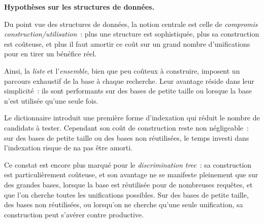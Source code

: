 \documentclass[11pt]{article}
\newenvironment{paraph}[1]{%
  \medskip
  \noindent\textbf{#1.}\quad

  \vspace{0.2cm}
}{%
  \medskip
}
\begin{document}
\begin{paraph}{Hypothèses sur les structures de données}
    Du point vue des structures de données, la notion centrale est celle de \textit{compromis construction/utilisation}~:
    plus une structure est sophistiquée, plus sa construction est coûteuse, et plus il faut
    amortir ce coût sur un grand nombre d'unifications pour en tirer un bénéfice réel.

    \vspace{0.2cm}
    Ainsi, la \textit{liste} et l'\textit{ensemble}, bien que peu coûteux à construire, imposent un parcours
    exhaustif de la base à chaque recherche. Leur avantage réside dans leur simplicité~: ils sont performants
    sur des bases de petite taille ou lorsque la base n'est utilisée qu'une seule fois.

    \vspace{0.2cm}
    Le dictionnaire introduit une première forme d'indexation qui réduit le nombre de candidats
    à tester. Cependant son coût de construction reste non négligeable~: sur des bases de petite taille ou des bases non réutilisées, 
    le temps investi dans l'indexation risque de na pas être amorti.

    \vspace{0.2cm}
    Ce constat est encore plus marqué pour le \textit{discrimination tree}~: sa construction est
    particulièrement coûteuse, et son avantage ne se manifeste pleinement que sur des grandes bases,
    lorsque la base est réutilisée pour de nombreuses requêtes, et que l'on cherche toutes les unifications possibles.
    Sur des bases de petite taille, des bases non réutilisées, ou lorsqu'on ne cherche qu'une seule unification, sa 
    construction peut s'avérer contre productive.
\end{paraph}
\end{document}
